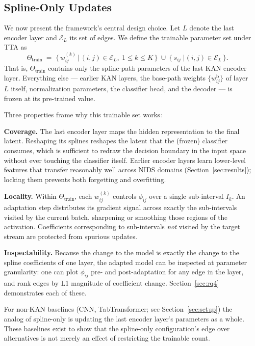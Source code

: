 \documentclass[10pt, conference, letterpaper]{IEEEtran}
\begin{document}
\subsection{Spline-Only Updates}
\label{sec:spline-only}

We now present the framework's central design choice. Let $L$ denote the last encoder layer and $\mathcal{E}_L$ its set of edges. We define the trainable parameter set under TTA as
\begin{equation}
\label{eq:theta-train}
\Theta_{\text{train}} \;=\; \Big\{\, w_{ij}^{(k)} \,\Big|\, (i,j) \in \mathcal{E}_L,\; 1 \leq k \leq K \,\Big\} \;\cup\; \Big\{\, s_{ij} \,\Big|\, (i,j) \in \mathcal{E}_L \,\Big\}.
\end{equation}
That is, $\Theta_{\text{train}}$ contains only the spline-path parameters of the last KAN encoder layer. Everything else --- earlier KAN layers, the base-path weights $\{w^{\text{b}}_{ij}\}$ of layer $L$ itself, normalization parameters, the classifier head, and the decoder --- is frozen at its pre-trained value.

Three properties frame why this trainable set works:

\textbf{Coverage.} The last encoder layer maps the hidden representation to the final latent. Reshaping its splines reshapes the latent that the (frozen) classifier consumes, which is sufficient to redraw the decision boundary in the input space without ever touching the classifier itself. Earlier encoder layers learn lower-level features that transfer reasonably well across NIDS domains (Section~\ref{sec:results}); locking them prevents both forgetting and overfitting.

\textbf{Locality.} Within $\Theta_{\text{train}}$, each $w_{ij}^{(k)}$ controls $\phi_{ij}$ over a single sub-interval $I_k$. An adaptation step distributes its gradient signal across exactly the sub-intervals visited by the current batch, sharpening or smoothing those regions of the activation. Coefficients corresponding to sub-intervals \emph{not} visited by the target stream are protected from spurious updates.

\textbf{Inspectability.} Because the change to the model is exactly the change to the spline coefficients of one layer, the adapted model can be inspected at parameter granularity: one can plot $\phi_{ij}$ pre- and post-adaptation for any edge in the layer, and rank edges by L1 magnitude of coefficient change. Section~\ref{sec:rq4} demonstrates each of these.

For non-KAN baselines (CNN, TabTransformer; see Section~\ref{sec:setup}) the analog of spline-only is updating the last encoder layer's parameters as a whole. These baselines exist to show that the spline-only configuration's edge over alternatives is not merely an effect of restricting the trainable count.
\end{document}

